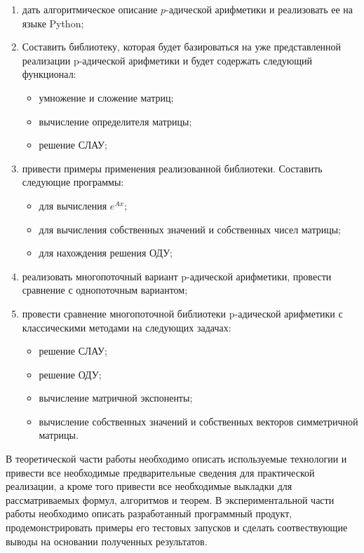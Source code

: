 \documentclass[master, och, times, assignment]{sty/SCWorks}
\begin{document}
\begin{enumerate}
	\item дать алгоритмическое описание $p$-адической арифметики и реализовать ее на языке Python;
	\item Составить библиотеку, которая будет базироваться на уже представленной реализации p-адической арифметики и будет содержать следующий функционал:  
	\begin{itemize}
    \item умножение и сложение матриц;
    \item вычисление определителя матрицы;
    \item решение СЛАУ;
    \end{itemize}
    \item привести примеры применения реализованной библиотеки. Составить следующие программы:
	\begin{itemize}
    \item для вычисления $e^{Ax}$;
    \item для вычисления собственных значений и собственных чисел \mbox{матрицы};
    \item для нахождения решения ОДУ;
    \end{itemize}
    \item реализовать многопоточный вариант p-адической арифметики, \mbox{провести} сравнение с однопоточным \mbox{вариантом};
    \item провести сравнение многопоточной библиотеки p-адической \mbox{арифметики} с классическими методами на следующих задачах:
    \begin{itemize}
    \item решение СЛАУ;
    \item решение ОДУ;    
 	\item вычисление матричной экспоненты;
 	\item вычисление собственных значений и собственных векторов симметричной матрицы.
    \end{itemize}
\end{enumerate}


В теоретической части работы необходимо описать используемые технологии и привести все необходимые предварительные сведения для \mbox{практической} реализации, а кроме того привести все необходимые \mbox{выкладки} для рассматриваемых формул, алгоритмов и теорем. В экспериментальной части работы необходимо описать разработанный программный продукт, продемонстрировать примеры его тестовых запусков и сделать соотвествующие выводы на основании полученных результатов.

\signatureline
	
\end{document}
